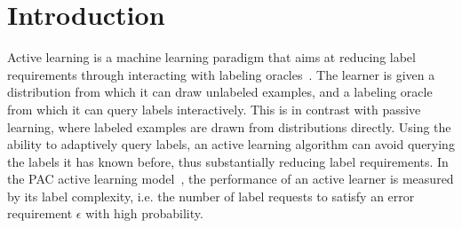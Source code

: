 \section{Introduction}



Active learning is a machine learning paradigm that aims at reducing label requirements through interacting with labeling oracles~\citep{S10}. The learner is given a distribution from which it can draw unlabeled examples,
and a labeling oracle from which it can query labels interactively. This is in contrast with passive learning, where labeled examples are drawn from distributions directly.
Using the ability to adaptively query labels, an active learning
algorithm can avoid querying the labels it has known before, thus substantially reducing label requirements.
In the PAC active learning model~\citep{V84,KSS94,BBL09,H14}, the performance of an active learner is measured by its label complexity, i.e. the number of label requests to satisfy an error requirement $\epsilon$ with high probability.



